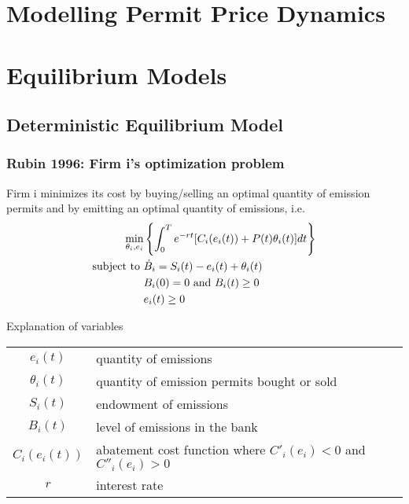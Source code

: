 \section{Modelling Permit Price Dynamics}
\section{Equilibrium Models}
\subsection{Deterministic Equilibrium Model}
\begin{frame}
\frametitle{Rubin 1996: Firm i's optimization problem}
Firm i minimizes its cost by buying/selling an optimal quantity of emission permits and by emitting an optimal quantity of emissions, i.e.
\begin{align}
\min_{\theta_i, e_i} & \left\{ \int_0^T e^{-rt} [C_i(e_i(t)) + P(t)\theta_i(t)]dt \right\} \\
\textnormal{subject to }
&\dot{B}_i = S_i(t) - e_i(t) + \theta_i(t) \\
&            B_i(0) = 0 \textnormal{ and } B_i(t) \ge 0 \\
&            e_i(t) \ge 0
\end{align}


{Explanation of variables}
\begin{tiny}
\begin{tabular}{cl}
$e_i(t)$ & quantity of emissions \\
$\theta_i(t)$ & quantity of emission permits bought or sold \\
$S_i(t)$ & endowment of emissions \\
$B_i(t)$ & level of emissions in the bank\\
$C_i(e_i(t))$ & abatement cost function where $C'_i(e_i) < 0$ and $C''_i(e_i) > 0$ \\
$r$ & interest rate \\
\end{tabular}
\end{tiny}
\end{frame}

